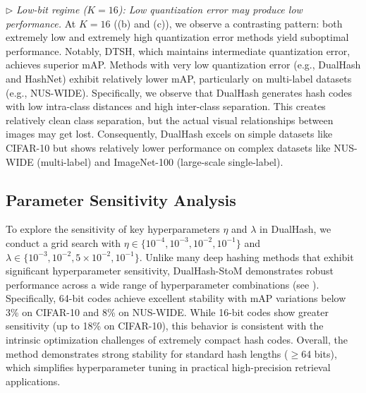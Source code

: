 \noindent\(\triangleright\) \textit{Low-bit regime ($K = 16$): Low quantization error may produce low performance.}
At $K = 16$ ((b) and (c)), we observe a contrasting pattern: both extremely low and extremely high quantization error methods yield suboptimal performance. Notably, DTSH, which maintains intermediate quantization error, achieves superior mAP. Methods with very low quantization error (e.g., DualHash and HashNet) exhibit relatively lower mAP, particularly on multi-label datasets (e.g., NUS-WIDE). Specifically, we observe that  DualHash generates hash codes with low intra-class distances and high inter-class separation. This creates relatively clean class separation, but the actual visual relationships between images may get lost. Consequently, DualHash excels on simple datasets like CIFAR-10 but shows relatively lower performance on complex datasets like NUS-WIDE (multi-label) and ImageNet-100 (large-scale single-label).

\subsection{Parameter Sensitivity Analysis}
To explore the sensitivity of key hyperparameters $\eta$ and $\lambda$ in 
DualHash, we conduct a grid search with $\eta \in \{10^{-4}, 10^{-3}, 
10^{-2}, 10^{-1}\}$ and $\lambda \in \{10^{-3}, 10^{-2}, 5\times 10^{-2}, 10^{-1}\}$. Unlike many deep hashing 
methods that exhibit significant hyperparameter sensitivity, DualHash-StoM 
demonstrates robust performance across a wide range of hyperparameter 
combinations (see ). 
Specifically, 64-bit codes achieve excellent stability with mAP variations 
below 3\% on CIFAR-10 and 8\% on NUS-WIDE. While 16-bit codes show greater 
sensitivity (up to 18\% on CIFAR-10), this behavior is consistent with the 
intrinsic optimization challenges of extremely compact hash codes. Overall, 
the method demonstrates strong stability for standard hash lengths ($\geq$64 bits), 
which simplifies hyperparameter tuning in practical high-precision retrieval 
applications.
